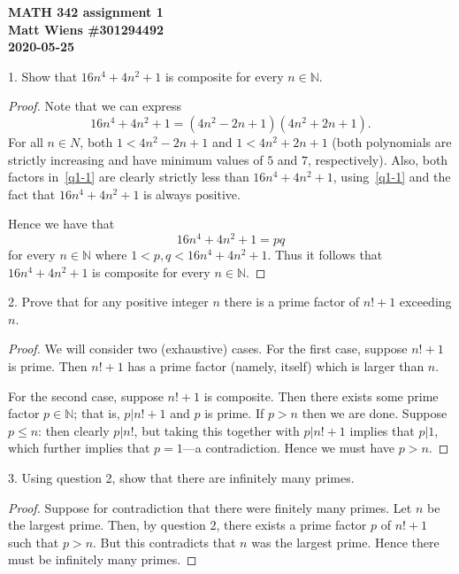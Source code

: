 \documentclass{article}
\newcommand{\N}{\mathbb{N}}
\begin{document}
\textbf{MATH 342 assignment 1} \\
\textbf{Matt Wiens \#301294492} \\
\textbf{2020-05-25}

1. Show that $16 n^4 + 4 n^2 + 1$ is composite for every $n \in \N$.

\begin{proof}

Note that we can express
%
\begin{equation}
    16 n^4 + 4 n^2 + 1 = (4 n^2 - 2 n + 1) (4 n^2 + 2 n + 1)
    .
    \label{q1-1}
\end{equation}
%
For all $n \in N$, both
$1 < 4 n^2 - 2 n + 1$ and
$1 < 4 n^2 + 2 n + 1$
(both polynomials are strictly increasing and have minimum values of $5$
and $7$, respectively). Also, both factors in~\eqref{q1-1} are clearly
strictly less than $16 n^4 + 4 n^2 + 1$, using~\eqref{q1-1} and the fact
that $16 n^4 + 4 n^2 + 1$ is always positive.

Hence we have that
%
\begin{equation*}
    16 n^4 + 4 n^2 + 1 = p q
\end{equation*}
%
for every $n \in \N$ where $1 < p, q < 16 n^4 + 4 n^2 + 1$.
Thus it follows that $16 n^4 + 4 n^2 + 1$ is composite for every $n \in \N$.

\end{proof}

\newpage

2. Prove that for any positive integer $n$ there is a prime factor of
   $n! + 1$ exceeding $n$.

\begin{proof}

We will consider two (exhaustive) cases. For the first case, suppose $n!
+ 1$ is prime. Then $n! + 1$ has a prime factor (namely, itself) which
is larger than $n$.

For the second case, suppose $n! + 1$ is composite. Then there exists
some prime factor $p \in \N$; that is, $p|n! + 1$ and $p$ is prime. If
$p > n$ then we are done. Suppose $p \leq n$: then clearly $p|n!$, but
taking this together with $p|n! + 1$ implies that $p|1$, which further
implies that $p = 1$---a contradiction. Hence we must have $p > n$.

\end{proof}

\newpage

3. Using question 2, show that there are infinitely many primes.

\begin{proof}

Suppose for contradiction that there were finitely many primes. Let $n$
be the largest prime. Then, by question 2, there exists a prime factor
$p$ of $n! + 1$ such that $p > n$. But this contradicts that $n$ was the
largest prime. Hence there must be infinitely many primes.

\end{proof}
\end{document}
